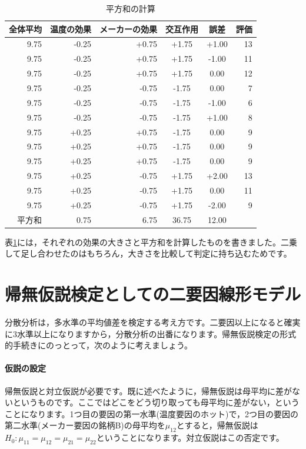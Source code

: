 \documentclass{ltjsarticle}
\begin{document}
\begin{table}[ht]
  \centering
  \caption{平方和の計算} 
  \begin{tabular}{rrrccr}
    \hline
  全体平均 & 温度の効果 & メーカーの効果 & 交互作用 & 誤差 & 評価 \\ 
    \hline
  9.75 & -0.25 & +0.75 &  +1.75 & +1.00 & 13 \\ 
  9.75 & -0.25 & +0.75 & +1.75& -1.00 & 11 \\ 
  9.75 & -0.25 & +0.75 & +1.75& 0.00 & 12 \\ \hline
  9.75 & -0.25 & -0.75 &-1.75 & 0.00 & 7 \\ 
  9.75 & -0.25 & -0.75 & -1.75& -1.00& 6\\ 
  9.75 & -0.25 & -0.75 & -1.75 & +1.00& 8 \\ \hline
  9.75 & +0.25 & +0.75 & -1.75 & 0.00 & 9 \\ 
  9.75 & +0.25 & +0.75 & -1.75& 0.00& 9 \\ 
  9.75 & +0.25 & +0.75 & -1.75 & 0.00& 9 \\ \hline
  9.75 & +0.25 & -0.75 & +1.75 & +2.00 & 13 \\ 
  9.75 & +0.25 & -0.75 & +1.75 & 0.00& 11 \\ 
  9.75 & +0.25 & -0.75 & +1.75 & -2.00& 9 \\ 
     \hline\hline
平方和 & 0.75 & 6.75 & 36.75 & 12.00 & \\\hline
  \end{tabular}
  \label{tbl::22_03}
\end{table}
表\ref{tbl::22_03}には，それぞれの効果の大きさと平方和を計算したものを書きました。二乗して足し合わせたのはもちろん，大きさを比較して判定に持ち込むためです。
\section{帰無仮説検定としての二要因線形モデル}
分散分析は，多水準の平均値差を検定する考え方です。二要因以上になると確実に3水準以上になりますから，分散分析の出番になります。帰無仮説検定の形式的手続きにのっとって，次のように考えましょう。
\paragraph{仮説の設定}帰無仮説と対立仮説が必要です。既に述べたように，帰無仮説は母平均に差がないというものです。ここではどこをどう切り取っても母平均に差がない，ということになります。1つ目の要因の第一水準(温度要因のホット)で，2つ目の要因の第二水準(メーカー要因の銘柄B)の母平均を$\mu_{12}$とすると，帰無仮説は$H_0:\mu_{11}=\mu_{12}=\mu_{21}=\mu_{22}$ということになります。対立仮説はこの否定です。
\end{document}
